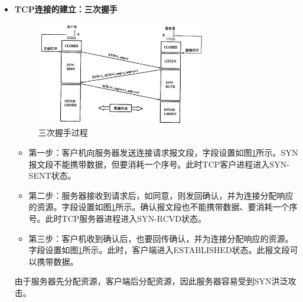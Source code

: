\documentclass[12pt, a4paper, oneside]{ctexart}
\begin{document}
\begin{itemize}
    \item {\bf TCP连接的建立：三次握手}
    \begin{figure}[h]
        \centering
        \includegraphics[width=0.7\textwidth]{./images/tcp_establish.png}
        \caption{三次握手过程}
        \label{tcp_establish}
    \end{figure}
    \begin{itemize}
        \item 第一步：客户机向服务器发送连接请求报文段，字段设置如图\ref{tcp_establish}所示。SYN报文段不能携带数据，但要消耗一个序号。此时TCP客户进程进入SYN-SENT状态。
        \item 第二步：服务器接收到请求后，如同意，则发回确认，并为连接分配响应的资源。字段设置如图\ref{tcp_establish}所示。确认报文段也不能携带数据、要消耗一个序号。此时TCP服务器进程进入SYN-RCVD状态。
        \item 第三步：客户机收到确认后，也要回传确认，并为连接分配响应的资源。字段设置如图\ref{tcp_establish}所示。此时，客户端进入ESTABLISHED状态。此报文段可以携带数据。
    \end{itemize}
    由于服务器先分配资源，客户端后分配资源，因此服务器容易受到SYN洪泛攻击。


\end{itemize}
\end{document}
